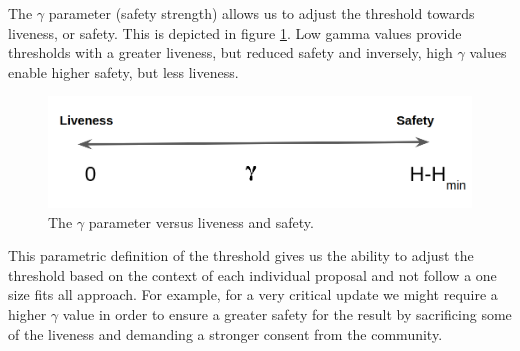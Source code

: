 %

The $\gamma$ parameter (safety strength) allows us to adjust the threshold 
towards liveness, or 
safety. This is depicted in figure \ref{fig:gamma_parameter}. Low gamma values 
provide thresholds with a greater liveness, but reduced safety and inversely, 
high $\gamma$ values enable higher safety, but less liveness. 

\begin{figure}[h!] %
	\centering
	\includegraphics[width=0.6\columnwidth,
	keepaspectratio]{figures/gamma.png}
	\caption{The $\gamma$ parameter versus liveness and safety.}
	\label{fig:gamma_parameter}
\end{figure}

This parametric definition of the threshold gives us the ability to adjust the 
threshold based on the context of each individual proposal and not follow a one 
size fits all approach. For example, for a very critical update we might 
require a higher $\gamma$ value in order to ensure a greater safety for the 
result by sacrificing some of the liveness and demanding a stronger consent 
from the community. 

